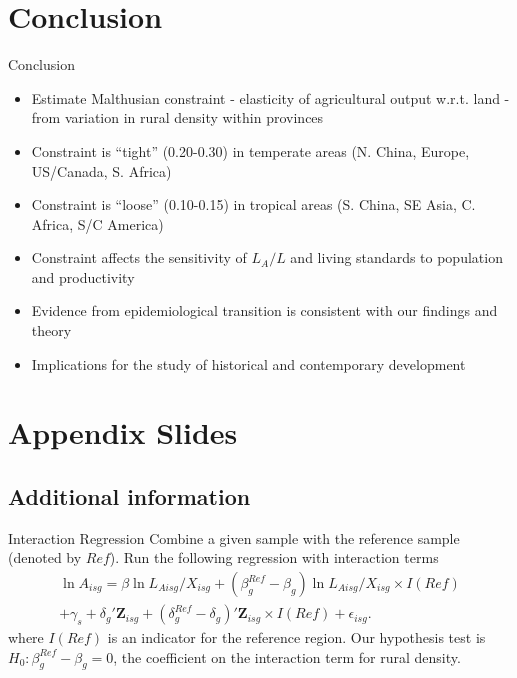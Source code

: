 \documentclass[10pt, xcolor=dvipsnames]{beamer}
\begin{document}
\section{Conclusion}

\begin{frame}{Conclusion}
\begin{itemize}
  \item Estimate Malthusian constraint - elasticity of agricultural output w.r.t. land - from variation in rural density within provinces
  \item Constraint is ``tight'' (0.20-0.30) in temperate areas (N. China, Europe, US/Canada, S. Africa)
  \item Constraint is ``loose'' (0.10-0.15) in tropical areas (S. China, SE Asia, C. Africa, S/C America)
  \item Constraint affects the sensitivity of $L_A/L$ and living standards to population and productivity
  \item Evidence from epidemiological transition is consistent with our findings and theory
  \item Implications for the study of historical and contemporary development
\end{itemize}
\end{frame}

\section{Appendix Slides}
\appendix

\subsection{Additional information}
\begin{frame}{Interaction Regression}\label{interaction}
Combine a given sample with the reference sample (denoted by $Ref$). Run the following regression with interaction terms
\begin{eqnarray}
    \ln A_{isg} = \beta \ln L_{Aisg}/X_{isg} + (\beta^{Ref}_g - \beta_g) \ln L_{Aisg}/X_{isg} \times I(Ref) \\ \nonumber
    + \gamma_{s} + \delta_g' \mathbf{Z}_{isg} + (\delta^{Ref}_g - \delta_g)'\mathbf{Z}_{isg} \times I(Ref) + \epsilon_{isg}. \label{EQ_interaction}
\end{eqnarray}
where $I(Ref)$ is an indicator for the reference region. Our hypothesis test is $H_0: \beta^{Ref}_g - \beta_g = 0$, the coefficient on the interaction term for rural density. 

\hfill \hyperlink{testing}{}
\end{frame}
\end{document}
